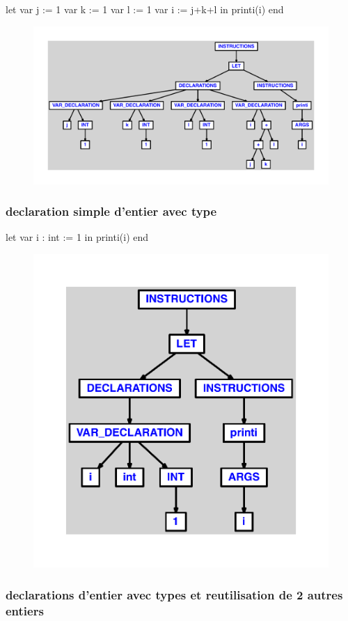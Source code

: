 \documentclass{article}
\begin{document}
\begin{verbatimtab}
let
	var j := 1
	var k := 1
	var l := 1
	var i := j+k+l
in
	printi(i)
end
\end{verbatimtab}
\begin{figure}[H]\centering\includegraphics[max width=\textwidth]{ast/ast_296.pdf}\end{figure}\subsubsection{declaration simple d'entier avec type}
\begin{verbatimtab}
let
	var i : int := 1
in
	printi(i)
end
\end{verbatimtab}
\begin{figure}[H]\centering\includegraphics[max width=\textwidth]{ast/ast_297.pdf}\end{figure}\subsubsection{declarations d'entier avec types et reutilisation de 2 autres entiers}
\end{document}
